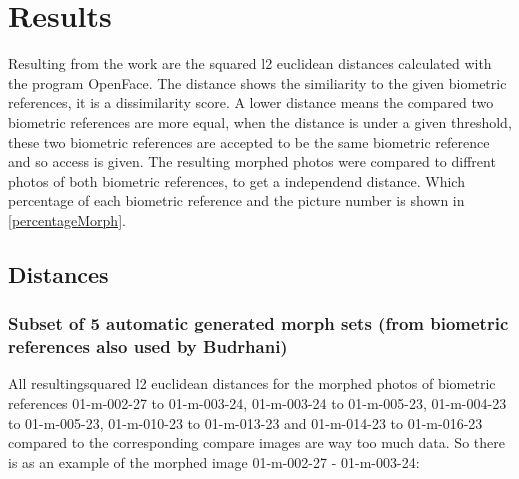 \section{Results}
Resulting from the work are the squared l2 euclidean distances calculated with the program OpenFace. The distance shows the similiarity to the given biometric references, it is a dissimilarity score. A lower distance means the compared two biometric references are more equal, when the distance is under a given threshold, these two biometric references are accepted to be the same biometric reference and so access is given. The resulting morphed photos were compared to diffrent photos of both biometric references, to get a independend distance. Which percentage of each biometric reference and the picture number is shown in \ref{percentageMorph}.
\subsection{Distances}

\subsubsection{Subset of 5 automatic generated morph sets (from biometric references also used by Budrhani)}\label{sec:subset5}
All resultingsquared l2 euclidean distances for the morphed photos of biometric references 01-m-002-27 to 01-m-003-24, 01-m-003-24 to 01-m-005-23, 01-m-004-23 to 01-m-005-23, 01-m-010-23 to 01-m-013-23 and 01-m-014-23 to 01-m-016-23 compared to the corresponding compare images are way too much data. So there is as an example of the morphed image 01-m-002-27 - 01-m-003-24:

